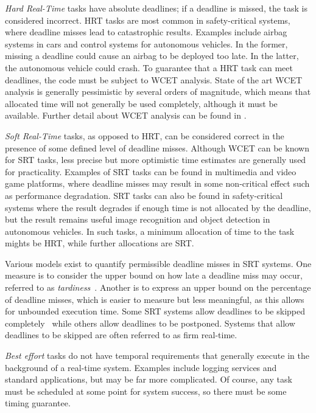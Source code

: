 \emph{Hard Real-Time} tasks have absolute deadlines; if a deadline is missed,
the task is considered incorrect. \gls{HRT} tasks are most common in safety-critical systems, where
deadline misses lead to catastrophic results.  Examples include airbag systems
in cars and control systems for autonomous vehicles.  In the former, missing a deadline could cause
an airbag to be deployed too late.  In the latter, the autonomous vehicle could crash.  To guarantee
that a \gls{HRT} task can meet deadlines, the code must be subject to {\gls{WCET}} analysis. State
of the art {\gls{WCET}} analysis is generally pessimistic by several orders of magnitude, which
means that allocated time will not generally be used completely, although it must be available.
Further detail about {\gls{WCET}} analysis can be found in \citet{Lv_GZDYZ_09}.

\emph{Soft Real-Time} tasks, as opposed to \gls{HRT}, can be
considered correct in the presence of some defined level of deadline misses. Although {\gls{WCET}}
can be known for {\gls{SRT}} tasks, less precise but more optimistic time estimates are generally
used for practicality.  Examples of \gls{SRT} tasks can be found in multimedia and video game platforms,
where deadline misses may result in some non-critical effect such as performance degradation.
\gls{SRT} tasks can also be found in safety-critical systems where the result degrades if enough time is not
allocated by the deadline, but the result remains useful \eg image recognition and object detection
in autonomous vehicles. In such tasks, a minimum allocation of time to the task mights be \gls{HRT},
while further allocations are \gls{SRT}.

Various models exist to quantify permissible deadline misses in \gls{SRT} systems.
One measure is to consider the upper bound on how late a deadline miss may occur, referred to as \emph{tardiness}~\citep{Devi:phd}.
Another is to express an upper bound on the percentage of deadline misses, which is easier to measure but less meaningful, as this allows for unbounded execution time.
Some \gls{SRT} systems allow deadlines to be skipped completely~\citep{Koren_Shasha_95} while others allow deadlines to be postponed. Systems that allow deadlines to be skipped are often referred to as firm real-time.

\emph{Best effort} tasks do not have temporal requirements that generally execute in the
background of a real-time system. Examples include logging services and standard applications, but
may be far more complicated. Of course, any task must be scheduled at some point for system success,
so there must be some timing guarantee. 

